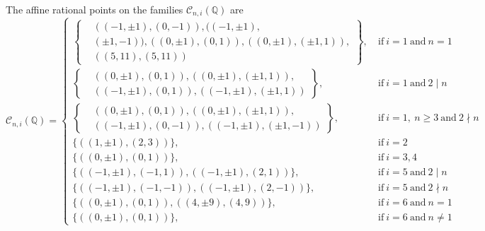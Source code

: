 \documentclass[handout]{beamer}
\begin{document}
\begin{frame}

\begin{alertblock}{The affine rational points on the families   $\mathcal{C}_{n,i}(\mathbb{Q}) $ are}
	\[
		\mathcal{C}_{n,i}(\mathbb{Q}) = \begin{cases}
			\left\{ \begin{aligned}
				&((-1,\pm 1),(0,-1)),((-1,\pm 1),\\ &(\pm 1,-1)),((0,\pm 1),(0,1)), ((0,\pm 1),(\pm 1,1)),\\ &((5,11),(5,11))
			\end{aligned}\right\}, \ &\text{if} \ i = 1 \ \text{and} \ n = 1 \\
			\left\{\begin{aligned}
				&((0,\pm 1),(0,1)),((0,\pm 1),(\pm 1,1)),\\ &((-1,\pm 1),(0,1)),((-1,\pm 1),(\pm 1,1))
			\end{aligned}\right\}, \ &\text{if} \ i = 1 \ \text{and} \ 2 \mid n \\
			\left\{\begin{aligned}
				&((0,\pm 1),(0,1)),((0,\pm 1),(\pm 1,1)), \\ &((-1,\pm 1),(0,-1)),((-1,\pm 1),(\pm 1,-1))
			\end{aligned}\right\}, \ &\text{if} \ i = 1, \ n \geq 3 \ \text{and} \ 2 \nmid n \\
			\{((1,\pm 1),(2,3))\}, \ &\text{if} \ i = 2 \\
			\{((0,\pm 1),(0,1))\}, \ &\text{if} \ i = 3, 4 \\
			\{((-1,\pm 1),(-1,1)),((-1,\pm 1),(2,1))\}, \ &\text{if} \ i = 5 \ \text{and} \ 2 \mid n \\
			\{((-1,\pm 1),(-1,-1)),((-1,\pm 1),(2,-1))\}, \ &\text{if} \ i = 5 \ \text{and} \ 2 \nmid n \\
			\{((0,\pm 1),(0,1)),((4,\pm 9),(4,9))\}, &\text{if} \ i = 6 \ \text{and} \ n = 1 \\
			\{((0,\pm 1),(0,1))\}, &\text{if} \ i = 6 \ \text{and} \ n \neq 1
		\end{cases}
	\]\end{alertblock}

\end{frame}
\end{document}
